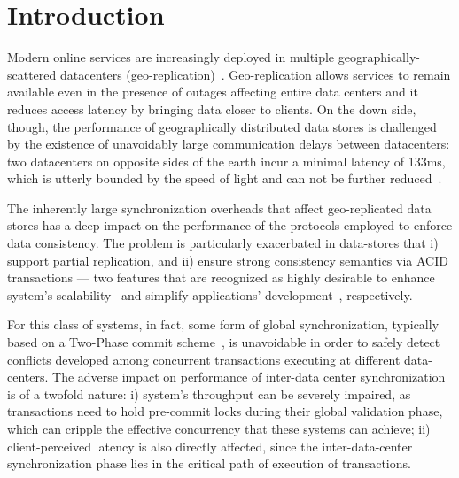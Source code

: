 \section{Introduction}
\label{sec:introduction}


Modern online services are increasingly deployed in multiple geographically-scattered datacenters (geo-replication)~\cite{spanner, kraska2013mdcc, li2012making}. Geo-replication allows services to remain available even in the presence of outages affecting entire data centers   and it reduces access latency by bringing data closer to clients. On the down side, though, the performance of geographically distributed data stores is challenged by the existence of unavoidably large communication delays between datacenters: two datacenters on opposite sides of the earth incur a minimal latency of 133ms, which is utterly bounded by the speed of light and can not be further reduced~\cite{bailis2013highly}. 

The inherently large synchronization overheads that affect geo-replicated data stores has a deep impact on the performance of the protocols employed to enforce data consistency. The problem is particularly exacerbated in  data-stores that i) support partial replication, and ii) ensure strong consistency semantics via ACID transactions --- two features that are recognized as highly desirable to enhance system's scalability~\cite{xxx} and simplify  applications' development~\cite{xxx}, respectively. 

For this class of systems, in fact, some form of global synchronization, typically based on a Two-Phase commit scheme~\cite{xxx}, is unavoidable in order to safely detect conflicts developed among  concurrent transactions executing at different data-centers. The adverse impact on performance of inter-data center synchronization is of a twofold nature: i) system's throughput can be severely impaired, as  transactions need to hold pre-commit locks during their global validation phase, which can cripple the effective concurrency that these systems can achieve; ii) client-perceived latency is also directly affected, since the inter-data-center  synchronization phase lies in the critical path of execution of transactions.




